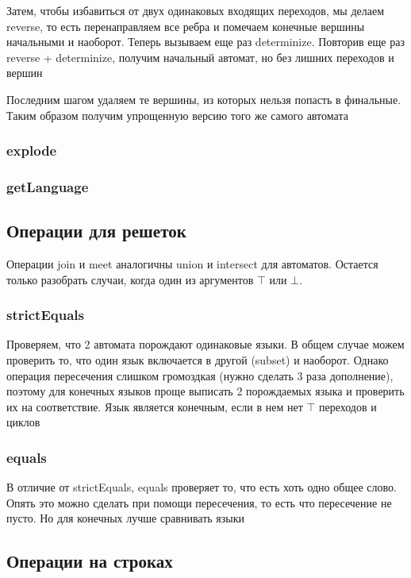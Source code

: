 Затем, чтобы избавиться от двух одинаковых входящих переходов, мы делаем reverse, то есть перенаправляем все ребра и помечаем конечные вершины начальными и наоборот. Теперь вызываем еще раз determinize. Повторив еще раз reverse + determinize, получим начальный автомат, но без лишних переходов и вершин

Последним шагом удаляем те вершины, из которых нельзя попасть в финальные. Таким образом получим упрощенную версию того же самого автомата

\subsubsection*{explode}
\subsubsection*{getLanguage}

\newpage
\subsection{Операции для решеток}
Операции join и meet аналогичны union и intersect для автоматов. Остается только разобрать случаи, когда один из аргументов $\top$ или $\bot$. 

\subsubsection*{strictEquals}
Проверяем, что 2 автомата порождают одинаковые языки. В общем случае можем проверить то, что один язык включается в другой (subset) и наоборот. Однако операция пересечения слишком громоздкая (нужно сделать 3 раза дополнение), поэтому для конечных языков проще выписать 2 порождаемых языка и проверить их на соответствие. Язык является конечным, если в нем нет $\top$ переходов и циклов

\subsubsection*{equals}
В отличие от strictEquals, equals проверяет то, что есть хоть одно общее слово. Опять это можно сделать при помощи пересечения, то есть что пересечение не пусто. Но для конечных лучше сравнивать языки





\newpage
\subsection{Операции на строках}
